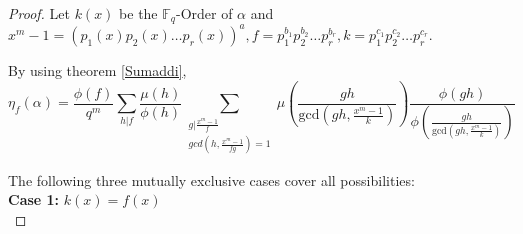 \documentclass[10pt,a4paper]{amsart}
\begin{document}
     \begin{proof}
        Let $k(x)$ be the $\mathbb{F}_q$-Order of $\alpha$ and $x^m-1=(p_1(x)p_2(x)\dots p_r(x))^a, f=p_1^{b_1} p_2^{b_2}\dots p_r^{b_r}, k=p_1^{c_1} p_2^{c_2}\dots p_r^{c_r}$. 

        By using theorem \ref{Sumaddi}, 
        \begin{equation}\label{EQThm}
            \eta_f(\alpha) = \displaystyle \frac{\phi(f)}{q^m}\sum_{h\vert f} \frac{\mu(h)}{\phi(h)} \sum_{\substack{g \vert \frac{x^m-1}{f}\\ gcd(h,\frac{x^m-1}{fg}) =1} } \mu \left( \frac{gh}{\text{gcd}(gh,\frac{x^m-1}{k})}\right)\frac{\phi(gh)}{\phi\left( \frac{gh}{\text{gcd}(gh,\frac{x^m-1}{k})}\right)}
        \end{equation}
         
        The following three mutually exclusive cases cover all possibilities:\\
         \textbf{Case 1:} $k(x)=f(x)$\\
         

\end{proof}
\end{document}
